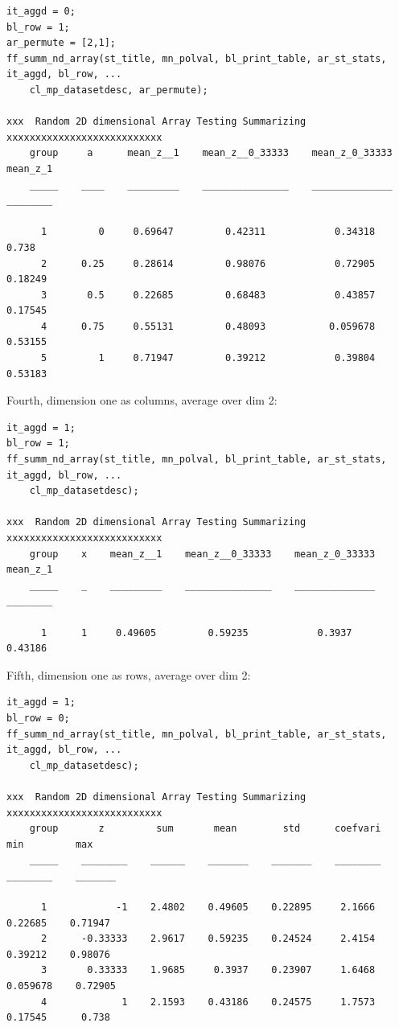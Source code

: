 \documentclass[
]{book}
\begin{document}
\begin{verbatim}
it_aggd = 0; 
bl_row = 1; 
ar_permute = [2,1];
ff_summ_nd_array(st_title, mn_polval, bl_print_table, ar_st_stats, it_aggd, bl_row, ...
    cl_mp_datasetdesc, ar_permute);

xxx  Random 2D dimensional Array Testing Summarizing  xxxxxxxxxxxxxxxxxxxxxxxxxxx
    group     a      mean_z__1    mean_z__0_33333    mean_z_0_33333    mean_z_1
    _____    ____    _________    _______________    ______________    ________

      1         0     0.69647         0.42311            0.34318         0.738 
      2      0.25     0.28614         0.98076            0.72905       0.18249 
      3       0.5     0.22685         0.68483            0.43857       0.17545 
      4      0.75     0.55131         0.48093           0.059678       0.53155 
      5         1     0.71947         0.39212            0.39804       0.53183 
\end{verbatim}

Fourth, dimension one as columns, average over dim 2:

\begin{verbatim}
it_aggd = 1; 
bl_row = 1; 
ff_summ_nd_array(st_title, mn_polval, bl_print_table, ar_st_stats, it_aggd, bl_row, ...
    cl_mp_datasetdesc);

xxx  Random 2D dimensional Array Testing Summarizing  xxxxxxxxxxxxxxxxxxxxxxxxxxx
    group    x    mean_z__1    mean_z__0_33333    mean_z_0_33333    mean_z_1
    _____    _    _________    _______________    ______________    ________

      1      1     0.49605         0.59235            0.3937        0.43186 
\end{verbatim}

Fifth, dimension one as rows, average over dim 2:

\begin{verbatim}
it_aggd = 1; 
bl_row = 0; 
ff_summ_nd_array(st_title, mn_polval, bl_print_table, ar_st_stats, it_aggd, bl_row, ...
    cl_mp_datasetdesc);

xxx  Random 2D dimensional Array Testing Summarizing  xxxxxxxxxxxxxxxxxxxxxxxxxxx
    group       z         sum       mean        std      coefvari      min         max  
    _____    ________    ______    _______    _______    ________    ________    _______

      1            -1    2.4802    0.49605    0.22895     2.1666      0.22685    0.71947
      2      -0.33333    2.9617    0.59235    0.24524     2.4154      0.39212    0.98076
      3       0.33333    1.9685     0.3937    0.23907     1.6468     0.059678    0.72905
      4             1    2.1593    0.43186    0.24575     1.7573      0.17545      0.738
\end{verbatim}
\end{document}
